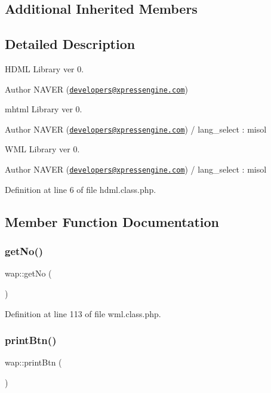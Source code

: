 \subsection*{Additional Inherited Members}


\subsection{Detailed Description}
H\+D\+ML Library ver 0. \begin{DoxyAuthor}{Author}
N\+A\+V\+ER (\href{mailto:developers@xpressengine.com}{\tt developers@xpressengine.\+com})
\end{DoxyAuthor}
mhtml Library ver 0. \begin{DoxyAuthor}{Author}
N\+A\+V\+ER (\href{mailto:developers@xpressengine.com}{\tt developers@xpressengine.\+com}) / lang\+\_\+select \+: misol
\end{DoxyAuthor}
W\+ML Library ver 0. \begin{DoxyAuthor}{Author}
N\+A\+V\+ER (\href{mailto:developers@xpressengine.com}{\tt developers@xpressengine.\+com}) / lang\+\_\+select \+: misol 
\end{DoxyAuthor}


Definition at line 6 of file hdml.\+class.\+php.



\subsection{Member Function Documentation}
\hypertarget{classwap_a4ac2316bf5cb56e0c351a97e04142e28}{}\label{classwap_a4ac2316bf5cb56e0c351a97e04142e28} 
\subsubsection{\texorpdfstring{get\+No()}{getNo()}}
{\footnotesize\ttfamily wap\+::get\+No (\begin{DoxyParamCaption}{ }\end{DoxyParamCaption})}



Definition at line 113 of file wml.\+class.\+php.

\hypertarget{classwap_a47437aad53e77ce53aebb4db6240cc38}{}\label{classwap_a47437aad53e77ce53aebb4db6240cc38} 
\subsubsection{\texorpdfstring{print\+Btn()}{printBtn()}\hspace{0.1cm}{\footnotesize\ttfamily [1/3]}}
{\footnotesize\ttfamily wap\+::print\+Btn (\begin{DoxyParamCaption}{ }\end{DoxyParamCaption})}



